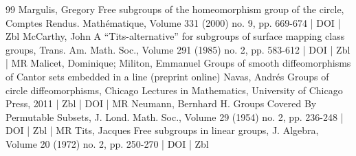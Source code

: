 \begin{thebibliography}{99}
 Margulis, Gregory Free subgroups of the homeomorphism group of the circle, Comptes Rendus. Mathématique, Volume 331 (2000) no. 9, pp. 669-674 | DOI | Zbl
 McCarthy, John A “Tits-alternative” for subgroups of surface mapping class groups, Trans. Am. Math. Soc., Volume 291 (1985) no. 2, pp. 583-612 | DOI | Zbl | MR
 Malicet, Dominique; Militon, Emmanuel Groups of smooth diffeomorphisms of Cantor sets embedded in a line (preprint online)
 Navas, Andrés Groups of circle diffeomorphisms, Chicago Lectures in Mathematics, University of Chicago Press, 2011 | Zbl | DOI | MR
 Neumann, Bernhard H. Groups Covered By Permutable Subsets, J. Lond. Math. Soc., Volume 29 (1954) no. 2, pp. 236-248 | DOI | Zbl | MR
 Tits, Jacques Free subgroups in linear groups, J. Algebra, Volume 20 (1972) no. 2, pp. 250-270 | DOI | Zbl
\end{thebibliography}
